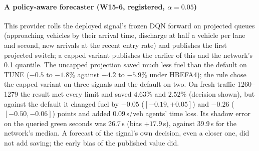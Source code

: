 \paragraph{A policy-aware forecaster (W15-6, registered, $\alpha=0.05$)} This provider rolls the deployed signal's frozen DQN forward on
projected queues (approaching vehicles by their arrival time, discharge at half a vehicle per lane and second, new arrivals at the recent
entry rate) and publishes the first projected switch; a capped variant publishes the earlier of this and the network's 0.1 quantile. The
uncapped projection saved much less fuel than the default on TUNE ($-0.5$ to $-1.8\%$ against $-4.2$ to $-5.9\%$ under HBEFA4); the rule chose
the capped variant on three signals and the default on two. On fresh traffic 1260--1279 the result met every limit and saved $4.63\%$ and
$2.52\%$ (decision shown), but against the default it changed fuel by $-0.05$ ($[-0.19,+0.05]$) and $-0.26$ ($[-0.50,-0.06]$) points and added
$0.09$\,s/veh agents' time loss. Its shadow error on the queried green seconds was 26.7\,s (bias $+17.9$\,s), against 39.9\,s for the
network's median. A forecast of the signal's own decision, even a closer one, did not add saving; the early bias of the published value did.
